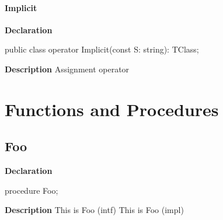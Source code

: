 \documentclass{report}
\newif\ifpdf
\begin{document}
\paragraph*{Implicit}\hspace*{\fill}

\label{ok_parse_impl.TClass-Implicit}
\begin{list}{}{
\setlength{\itemindent}{0cm}
\setlength{\listparindent}{0cm}
\setlength{\leftmargin}{\evensidemargin}
\addtolength{\leftmargin}{\tmplength}
\settowidth{\labelsep}{X}
\addtolength{\leftmargin}{\labelsep}
\setlength{\labelwidth}{\tmplength}
}
\item[\textbf{Declaration}\hfill]
\ifpdf
\begin{flushleft}
\fi
\begin{ttfamily}
public class operator Implicit(const S: string): TClass;\end{ttfamily}

\ifpdf
\end{flushleft}
\fi

\par
\item[\textbf{Description}]
Assignment operator

\end{list}
\section{Functions and Procedures}
\ifpdf
\subsection*{\large{\textbf{Foo}}\normalsize\hspace{1ex}\hrulefill}
\else
\subsection*{Foo}
\fi
\label{ok_parse_impl-Foo}
\begin{list}{}{
\setlength{\itemindent}{0cm}
\setlength{\listparindent}{0cm}
\setlength{\leftmargin}{\evensidemargin}
\addtolength{\leftmargin}{\tmplength}
\settowidth{\labelsep}{X}
\addtolength{\leftmargin}{\labelsep}
\setlength{\labelwidth}{\tmplength}
}
\item[\textbf{Declaration}\hfill]
\ifpdf
\begin{flushleft}
\fi
\begin{ttfamily}
procedure Foo;\end{ttfamily}

\ifpdf
\end{flushleft}
\fi

\par
\item[\textbf{Description}]
This is Foo (intf) This is Foo (impl)

\end{list}
\ifpdf
\end{document}
